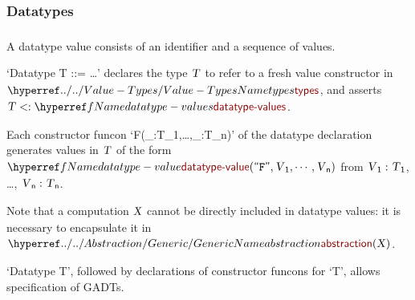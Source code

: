 \subsubsection*{Datatypes}\hypertarget{datatypes}{}\label{datatypes}

\begin{align*}
  [ ~ 
  \KEY{Type} ~ & \NAMEREF{datatype-values} \\
  \KEY{Funcon} ~ & \NAMEREF{datatype-value} \\
  \KEY{Funcon} ~ & \NAMEREF{datatype-value-id} \\
  \KEY{Funcon} ~ & \NAMEREF{datatype-value-elements}
  ~ ]
\end{align*}
A datatype value consists of an identifier and a sequence of values.

{}`Datatype T ::= \ldots{}{}' declares the type $\SHADE{\VAR{T}}$ to refer to a fresh value
  constructor in $\SHADE{\NAMEHYPER{../..}{Value-Types}{types}}$, and asserts $\SHADE{\VAR{T} <: \NAMEREF{datatype-values}}$.

Each constructor funcon {}`F(\_:T\_1,\ldots{},\_:T\_n){}' of the datatype declaration
  generates values in $\SHADE{\VAR{T}}$ of the form $\SHADE{\NAMEREF{datatype-value}
           ( \STRING{F},   
             \VAR{V}\SUB{1},   
             \cdots,   
             \VAR{V}\SUB{n} )}$ from
  $\SHADE{\VAR{V}\SUB{1} : \VAR{T}\SUB{1}}$, \ldots{}, $\SHADE{\VAR{V}\SUB{n} : \VAR{T}\SUB{n}}$.

Note that a computation $\SHADE{\VAR{X}}$ cannot be directly included in datatype values:
  it is necessary to encapsulate it in $\SHADE{\NAMEHYPER{../../Abstraction}{Generic}{abstraction}
           ( \VAR{X} )}$.

{}`Datatype T{}', followed by declarations of constructor funcons for {}`T{}',
  allows specification of GADTs.


